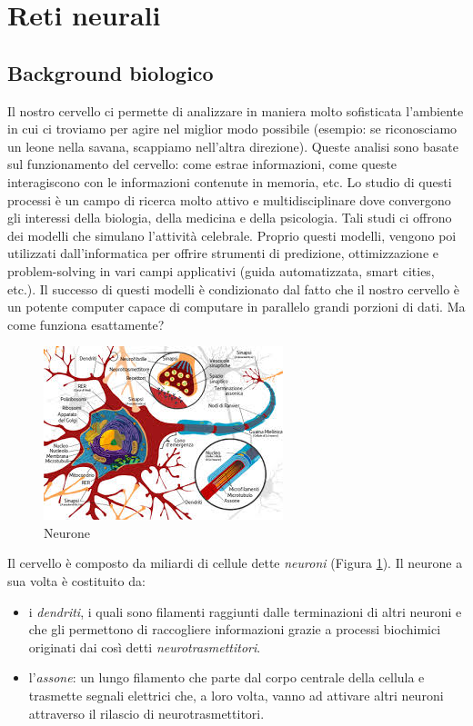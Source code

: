 \documentclass[10pt,a4paper]{article}
\begin{document}
\section{Reti neurali}

\subsection{Background biologico}

Il nostro cervello ci permette di analizzare in maniera molto sofisticata l'ambiente in cui ci troviamo per agire nel miglior modo possibile (esempio: se riconosciamo un leone nella savana, scappiamo nell'altra direzione). Queste analisi sono basate sul funzionamento del cervello: come estrae informazioni, come queste interagiscono con le informazioni contenute in memoria, etc. Lo studio di questi processi è un campo di ricerca molto attivo e multidisciplinare dove convergono gli interessi della biologia, della medicina e della psicologia.
Tali studi ci offrono dei modelli che simulano l'attività celebrale. Proprio questi modelli, vengono poi utilizzati dall'informatica per offrire strumenti di predizione, ottimizzazione e problem-solving in vari campi applicativi (guida automatizzata, smart cities, etc.). Il successo di questi modelli è condizionato dal fatto che il nostro cervello è un potente computer capace di computare in parallelo grandi porzioni di dati. Ma come funziona esattamente?

\begin{figure}
\centering
\includegraphics[scale=0.7]{img/neurone.jpeg}
\caption{Neurone}
\label{fig:1}
\end{figure}

Il cervello è composto da miliardi di cellule dette \emph{neuroni} (Figura \ref{fig:1}). Il neurone a sua volta è costituito da:
\begin{itemize}
\item{i \emph{dendriti}, i quali sono filamenti raggiunti dalle terminazioni di altri neuroni e che gli permettono di raccogliere informazioni grazie a processi biochimici originati dai così detti \emph{neurotrasmettitori}.}
\item{l'\emph{assone}: un lungo filamento che parte dal corpo centrale della cellula e trasmette segnali elettrici che, a loro volta, vanno ad attivare altri neuroni attraverso il rilascio di neurotrasmettitori.}
\end{itemize}
\end{document}
